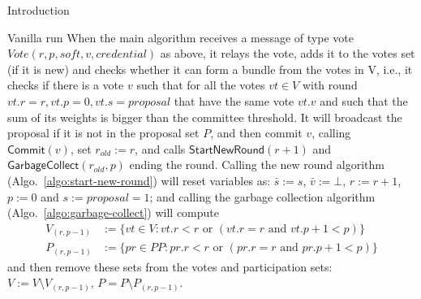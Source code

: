 \documentclass[10pt,a4paper]{article}
\begin{document}
\begin{section}{Introduction}
\begin{subsection}{Vanilla run}
When the main algorithm receives a message of type vote 
$Vote(r,p,soft,v,credential)$ as above, it relays the vote, adds it to the
votes set (if it is new) and checks whether it can form a bundle from the 
votes in V, i.e., it checks if there is a vote $v$ such that for all the votes 
$vt\in V$ with round $vt.r=r, vt.p=0, vt.s=proposal$ that have the same vote $vt.v$ 
and such that the sum of its weights is bigger than the committee 
threshold. 
It will broadcast the proposal if it is not in the proposal set $P$,
and then commit $v$, calling $\mathsf{Commit}(v)$, set $r_{old}:=r$,
and calls $\mathsf{StartNewRound}(r+1)$ and $\mathsf{GarbageCollect}(r_{old},p)$
ending the round.
Calling the new round algorithm (Algo.~\ref{algo:start-new-round}) will
reset variables as: $\bar s:=s$, $\bar{v}:=\bot$, $r:=r+1$, $p:=0$ and
$s:=proposal=1$;
and calling the garbage collection algorithm (Algo.~\ref{algo:garbage-collect}) 
will compute 
$$
\begin{array}{rl}
V_{(r,p-1)} & :=\{vt\in V : vt.r < r \text{ or } (vt.r = r \text{ and } vt.p+1 < p)\}\\
P_{(r,p-1)} & :=\{pr\in PP: pr.r < r \text{ or } (pr.r = r \text{ and } pr.p + 1 < p)\}
\end{array}
$$
and then remove these sets from the votes and participation sets: $V:=V\setminus V_{(r,p-1)}$,
$P = P\setminus P_{(r,p-1)}$.






\end{subsection}

\end{section}
\end{document}
